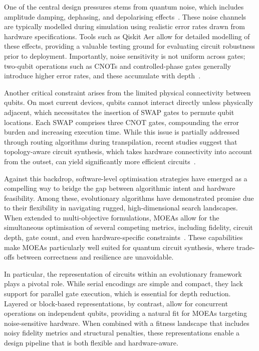 \documentclass[11pt,a4paper]{article}
\begin{document}
One of the central design pressures stems from quantum noise, which includes amplitude damping, dephasing, and depolarising effects~\cite{Clerk2008IntroductionTQ}. These noise channels are typically modelled during simulation using realistic error rates drawn from hardware specifications. Tools such as Qiskit Aer allow for detailed modelling of these effects, providing a valuable testing ground for evaluating circuit robustness prior to deployment. Importantly, noise sensitivity is not uniform across gates; two-qubit operations such as CNOTs and controlled-phase gates generally introduce higher error rates, and these accumulate with depth~\cite{Chow2012UniversalQG}.\newline

Another critical constraint arises from the limited physical connectivity between qubits. On most current devices, qubits cannot interact directly unless physically adjacent, which necessitates the insertion of SWAP gates to permute qubit locations. Each SWAP comprises three CNOT gates, compounding the error burden and increasing execution time. While this issue is partially addressed through routing algorithms during transpilation, recent studies suggest that topology-aware circuit synthesis, which takes hardware connectivity into account from the outset, can yield significantly more efficient circuits~\cite{Pedram2016LayoutOF}.\newline

Against this backdrop, software-level optimisation strategies have emerged as a compelling way to bridge the gap between algorithmic intent and hardware feasibility. Among these, evolutionary algorithms have demonstrated promise due to their flexibility in navigating rugged, high-dimensional search landscapes. When extended to multi-objective formulations, MOEAs allow for the simultaneous optimisation of several competing metrics, including fidelity, circuit depth, gate count, and even hardware-specific constraints~\cite{Zhou2011MultiobjectiveEA, Sarvaghad_Moghaddam}. These capabilities make MOEAs particularly well suited for quantum circuit synthesis, where trade-offs between correctness and resilience are unavoidable.\newline

In particular, the representation of circuits within an evolutionary framework plays a pivotal role. While serial encodings are simple and compact, they lack support for parallel gate execution, which is essential for depth reduction. Layered or block-based representations, by contrast, allow for concurrent operations on independent qubits, providing a natural fit for MOEAs targeting noise-sensitive hardware. When combined with a fitness landscape that includes noisy fidelity metrics and structural penalties, these representations enable a design pipeline that is both flexible and hardware-aware.
\end{document}
